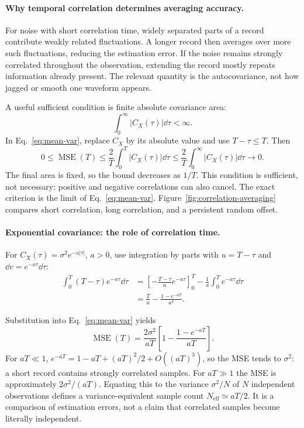 \paragraph{Why temporal correlation determines averaging accuracy.}
For noise with short correlation time, widely separated parts of a record contribute weakly related fluctuations. A longer record then averages over more such fluctuations, reducing the estimation error. If the noise remains strongly correlated throughout the observation, extending the record mostly repeats information already present. The relevant quantity is the autocovariance, not how jagged or smooth one waveform appears.

A useful sufficient condition is finite absolute covariance area:
\[
\int_0^\infty|C_X(\tau)|\dd\tau<\infty.
\]
In Eq.~\eqref{eq:mean-var}, replace $C_X$ by its absolute value and use $T-\tau\leq T$. Then
\[
0\leq\operatorname{MSE}(T)
\leq\frac2T\int_0^T|C_X(\tau)|\dd\tau
\leq\frac2T\int_0^\infty|C_X(\tau)|\dd\tau\longrightarrow0.
\]
The final area is fixed, so the bound decreases as $1/T$. This condition is sufficient, not necessary: positive and negative correlations can also cancel. The exact criterion is the limit of Eq.~\eqref{eq:mean-var}. Figure~\ref{fig:correlation-averaging} compares short correlation, long correlation, and a persistent random offset.

\CorrelationAveragingFigure

\paragraph{Exponential covariance: the role of correlation time.}
For $C_X(\tau)=\sigma^2e^{-a|\tau|}$, $a>0$, use integration by parts with $u=T-\tau$ and $\dd v=e^{-a\tau}\dd\tau$:
\begin{align*}
\int_0^T(T-\tau)e^{-a\tau}\dd\tau
&=\left[-\frac{T-\tau}{a}e^{-a\tau}\right]_0^T
-\frac1a\int_0^T e^{-a\tau}\dd\tau\\
&=\frac{T}{a}-\frac{1-e^{-aT}}{a^2}.
\end{align*}

Substitution into Eq.~\eqref{eq:mean-var} yields
\begin{equation}
\operatorname{MSE}(T)=\frac{2\sigma^2}{aT}
\left[1-\frac{1-e^{-aT}}{aT}\right].
\end{equation}
For $aT\ll1$, $e^{-aT}=1-aT+(aT)^2/2+O((aT)^3)$, so the MSE tends to $\sigma^2$: a short record contains strongly correlated samples. For $aT\gg1$ the MSE is approximately $2\sigma^2/(aT)$. Equating this to the variance $\sigma^2/N$ of $N$ independent observations defines a variance-equivalent sample count $N_{\mathrm{eff}}\simeq aT/2$. It is a comparison of estimation errors, not a claim that correlated samples become literally independent.


